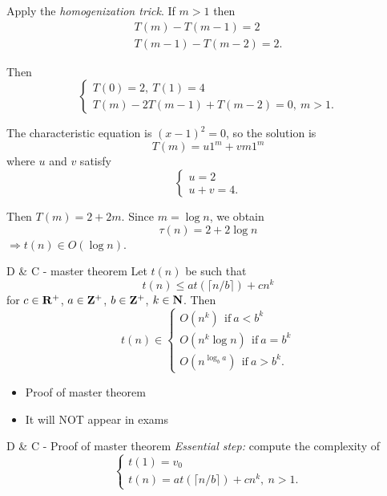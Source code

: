 \documentclass{beamer}
\begin{document}
%
\begin{frame}
	Apply the \emph{homogenization trick}. If $m > 1$ then
	\[
		\begin{array}{c}
			T(m) - T(m-1) = 2\\
			T(m-1) - T(m-2) = 2.
		\end{array}
	\]
\end{frame}
%
\begin{frame}
	Then
	\[
		\begin{cases}
			T(0)= 2,\ T(1) = 4\\
			T(m) - 2T(m-1) + T(m-2)= 0,\ m > 1.
		\end{cases}
	\]
\end{frame}
%
\begin{frame}
	The characteristic equation is $(x - 1)^2= 0$, so the solution is
	\[
		T(m) = u1^m + vm1^m
	\]
	where $u$ and $v$ satisfy
	\[
		\begin{cases}
			u = 2\\
			u + v = 4.
		\end{cases}
	\]
\end{frame}
%
\begin{frame}
	Then $T(m) = 2 + 2m$. Since $m = \log n$, we obtain
	\[
		\tau(n) = 2 + 2\log n
	\]
	$\Rightarrow t(n) \in O(\log n)$.
\end{frame}
\begin{frame}{D \& C - master theorem}
	Let $t(n)$ be such that
	\[
		t(n) \leq at(\lceil n/b \rceil) + cn^k
	\]
	for $c \in \mathbf{R}^+$, $a \in \mathbf{Z}^+$, $b \in \mathbf{Z}^+$, $k \in \mathbf{N}$. Then
	\[
		t(n) \in
		\begin{cases}
			O(n^k)\ \ \text{if}\ a < b^k\\
			O(n^k\log n)\ \ \text{if}\ a = b^k\\
			O(n^{\log_b a})\ \ \text{if}\ a > b^k.
		\end{cases}
	\]
\end{frame}
%
\begin{frame}
	\begin{itemize}
		\item Proof of master theorem
		\item It will NOT appear in exams
	\end{itemize}
\end{frame}
%
\begin{frame}{D \& C - Proof of master theorem}
	\emph{Essential step:} compute the complexity of
	\[
		\begin{cases}\label{mtr} %
			t(1)= v_0\\
			t(n)= at(\lceil n/b \rceil) + cn^k,\ n > 1.
		\end{cases}
	\]
\end{frame}
\end{document}
